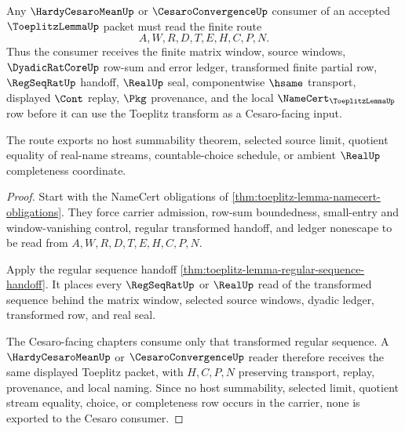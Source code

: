 \begin{theorem}\label{thm:toeplitz-lemma-cesaro-consumer-route}
Any $\HardyCesaroMeanUp$ or $\CesaroConvergenceUp$ consumer of an accepted
$\ToeplitzLemmaUp$ packet must read the finite route
$$
A,W,R,D,T,E,H,C,P,N .
$$
Thus the consumer receives the finite matrix window, source windows,
$\DyadicRatCoreUp$ row-sum and error ledger, transformed finite partial row,
$\RegSeqRatUp$ handoff, $\RealUp$ seal, componentwise $\hsame$ transport,
displayed $\Cont$ replay, $\Pkg$ provenance, and the local
$\NameCert_{\ToeplitzLemmaUp}$ row before it can use the Toeplitz transform as
a Cesaro-facing input.

The route exports no host summability theorem, selected source limit, quotient
equality of real-name streams, countable-choice schedule, or ambient $\RealUp$
completeness coordinate.
\end{theorem}
\begin{proof}
Start with the NameCert obligations of
\autoref{thm:toeplitz-lemma-namecert-obligations}. They force carrier
admission, row-sum boundedness, small-entry and window-vanishing control,
regular transformed handoff, and ledger nonescape to be read from
$A,W,R,D,T,E,H,C,P,N$.

Apply the regular sequence handoff
\autoref{thm:toeplitz-lemma-regular-sequence-handoff}. It places every
$\RegSeqRatUp$ or $\RealUp$ read of the transformed sequence behind the matrix
window, selected source windows, dyadic ledger, transformed row, and real seal.

The Cesaro-facing chapters consume only that transformed regular sequence. A
$\HardyCesaroMeanUp$ or $\CesaroConvergenceUp$ reader therefore receives the
same displayed Toeplitz packet, with $H,C,P,N$ preserving transport, replay,
provenance, and local naming. Since no host summability, selected limit,
quotient stream equality, choice, or completeness row occurs in the carrier,
none is exported to the Cesaro consumer.
\end{proof}



